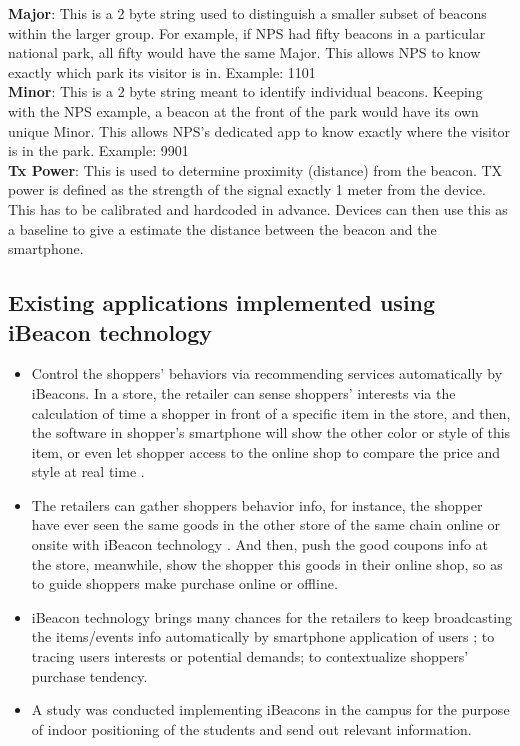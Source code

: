 \documentclass[12pt]{article}
\begin{document}
\textbf{Major}: This is a 2 byte string used to distinguish a smaller subset of beacons within the larger group. For example, if NPS had fifty beacons in a particular national park, all fifty would have the same Major. This allows NPS to know exactly which park its visitor is in. Example: 1101  \\

\textbf{Minor}: This is a 2 byte string meant to identify individual beacons. Keeping with the NPS example, a beacon at the front of the park would have its own unique Minor. This allows NPS’s dedicated app to know exactly where the visitor is in the park. Example: 9901\\

\textbf{Tx Power}: This is used to determine proximity (distance) from the beacon. TX power is defined as the strength of the signal exactly 1 meter from the device. This has to be calibrated and hardcoded in advance. Devices can then use this as a baseline to give a estimate the distance between the beacon and the smartphone.  \\

\subsection{Existing applications implemented using iBeacon technology}

\begin{itemize}
	\item Control the shoppers’ behaviors via recommending services automatically by iBeacons. In a store, the retailer can sense shoppers’ interests via the calculation of time a shopper in front of a specific item in the store, and then, the software in shopper’s smartphone will show the other color or style of this item, or even let shopper access to the online shop to compare the price and style at real time \cite{beacons}.

\item The retailers can gather shoppers behavior info, for instance, the shopper have ever seen the same goods in the other store of the same chain online or onsite with iBeacon technology \cite{beacons}. And then, push the good coupons info at the store, meanwhile, show the shopper this goods in their online shop, so as to guide shoppers make purchase online or offline.

\item iBeacon technology brings many chances for the retailers to keep broadcasting the items/events info automatically by smartphone application of users \cite{beacons}; to tracing users interests or potential demands; to contextualize shoppers’ purchase tendency.

\item{} A study was conducted implementing iBeacons in the campus for the purpose of indoor positioning of the students and send out relevant information. \cite{campus}

\end{itemize}
\end{document}
